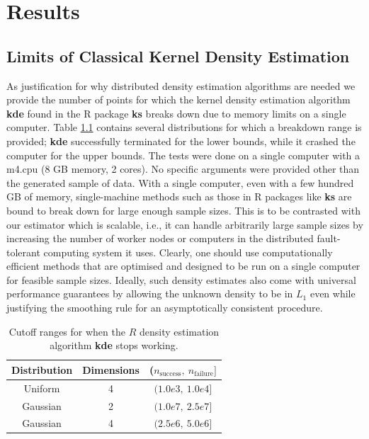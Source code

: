 \documentclass{report}
\begin{document}
\chapter{Results}

\section{Limits of Classical Kernel Density Estimation}
As justification for why distributed density estimation algorithms are needed we provide the number of points for which the kernel density estimation
algorithm \textbf{kde} found in the R package \textbf{ks} \cite{ks} breaks down due to memory limits on a single computer. 
Table \ref{ks_table} contains several distributions for which a breakdown range is provided;
\textbf{kde} successfully terminated for the lower bounds, while it crashed the computer for the upper bounds. The tests were done on a single computer with a m4.cpu (8 GB memory, 2 cores). No specific arguments were provided other than the generated sample of data. 
With a single computer, even with a few hundred GB of memory, single-machine methods such as those in R packages like \textbf{ks} are bound to break down for large enough sample sizes. This is to be contrasted with our estimator which is scalable, i.e., it can handle arbitrarily large sample sizes by increasing the number of worker nodes or computers in the distributed fault-tolerant computing system it uses. 
Clearly, one should use computationally efficient methods that are optimised and designed to be run on a single computer for feasible sample sizes. Ideally, such density estimates also come with universal performance guarantees by allowing the unknown density to be in $L_1$ even while justifying the smoothing rule for an asymptotically consistent procedure.

\begin{table}[H]
\begin{center}
\begin{tabular}{|c  c | c |}
	\hline
	Distribution & Dimensions & ($n_{\text{success}},\ n_{\text{failure}}]$ \\
	\hline
	Uniform	  & 4  & 	$(1.0e3,\  1.0e4]$\\
	Gaussian  & 2  & 	$(1.0e7,\  2.5e7]$\\
	Gaussian  & 4  & 	$(2.5e6 ,\ 5.0e6]$\\
	\hline
\end{tabular}
\end{center}
\caption{Cutoff ranges for when the $R$ density estimation algorithm \textbf{kde} stops working.}
\label{ks_table}
\end{table}
\end{document}
